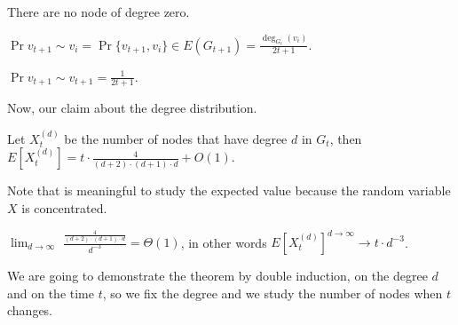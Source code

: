     \obs There are no node of degree zero.
    
    \obs $\Pr{v_{t+1} \sim v_i} = \Pr{\{ v_{t+1}, v_i \} \in E(G_{t+1})} = \frac{\deg_{G_t}(v_i)}{2t+1}$.
    
    \obs $\Pr{v_{t+1} \sim v_{t+1}} = \frac{1}{2t+1}$.
    
    Now, our claim about the degree distribution.
    
    \begin{thm}\label{thm:pref-attach-degree}
        Let $X_t^{\left(d\right)}$ be the number of nodes that have degree $d$ in $G_t$, then \\ $E\left[X_t^{\left(d\right)}\right] = t \cdot \frac{4}{(d+2) \cdot (d+1) \cdot d} + O(1)$.
    \end{thm}

    Note that is meaningful to study the expected value because the random variable $X$ is concentrated.
    
    \obs $\lim_{d \to \infty}$ $\frac{\frac{4}{(d+2) \cdot (d+1) \cdot d}}{d^{-3}} = \Theta(1)$, in other words $E\left[X_t^{\left(d\right)}\right]^{d \to \infty} \to t \cdot d^{-3}$.
    
    We are going to demonstrate the theorem by double induction, on the degree $d$ and on the time $t$, so we fix the degree and we study the number of nodes when $t$ changes.
    
